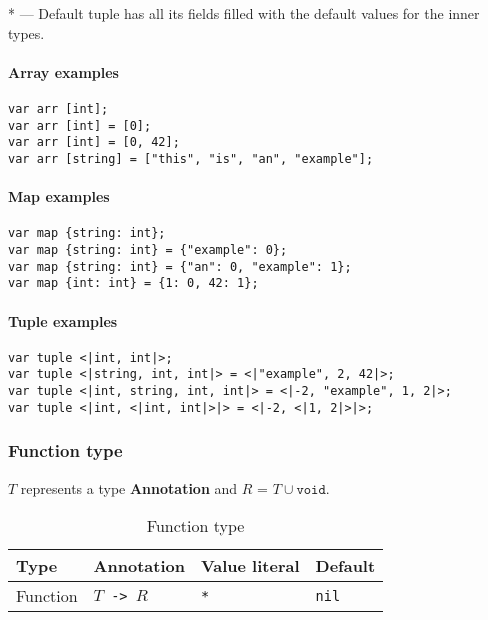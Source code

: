 \documentclass{article}
\begin{document}
* --- Default tuple has all its fields filled with the default values for the
inner types.

\paragraph{Array examples}
\texttt{var arr [int];} \\
\texttt{var arr [int] = [0];} \\
\texttt{var arr [int] = [0, 42];} \\
\texttt{var arr [string] = ["this", "is", "an", "example"];}

\paragraph{Map examples}
\texttt{var map \{string: int\}; }\\
\texttt{var map \{string: int\} = \{"example": 0\};} \\
\texttt{var map \{string: int\} = \{"an": 0, "example": 1\};} \\
\texttt{var map \{int: int\} = \{1: 0, 42: 1\};}

\paragraph{Tuple examples}
\texttt{var tuple <|int, int|>;} \\
\texttt{var tuple <|string, int, int|> = <|"example", 2, 42|>;} \\
\texttt{var tuple <|int, string, int, int|> = <|-2, "example", 1, 2|>;} \\
\texttt{var tuple <|int, <|int, int|>|> = <|-2, <|1, 2|>|>;}

\subsubsection{Function type}
$T$ represents a type \textbf{Annotation} and $R$ = $T \cup { \texttt{void} }$.

\begin{table}[h]
\centering
\label{function-type}
\begin{tabular}{|l|l|l|l|} \hline
\textbf{Type} & \textbf{Annotation}  & \textbf{Value literal} & \textbf{Default} \\ \hline
Function      & \texttt{$T$ -> $R$ } & \texttt{*}             & \texttt{nil}     \\ \hline
\end{tabular}
\caption{Function type}
\end{table}
\end{document}
